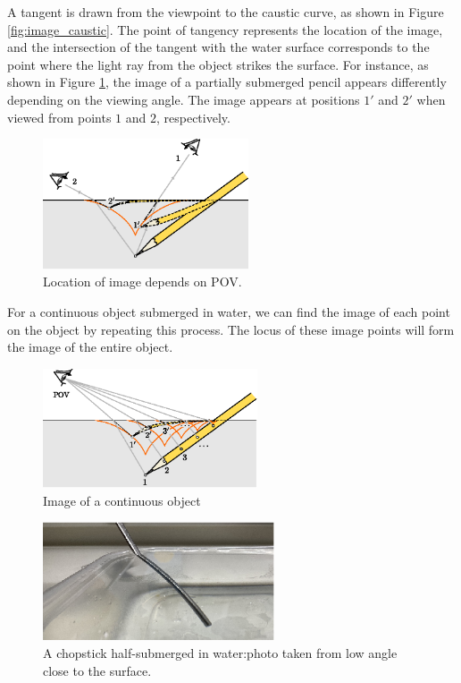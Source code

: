 \documentclass[twocolumn]{article}
\begin{document}
A tangent is drawn from the viewpoint to the caustic curve, as shown in Figure \ref{fig:image_caustic}. The point of tangency represents the location of the image, and the intersection of the tangent with the water surface corresponds to the point where the light ray from the object strikes the surface.
For instance, as shown in Figure \ref{fig:pencil_view}, the image of a partially submerged pencil appears differently depending on the viewing angle. The image appears at positions $1'$ and $2'$ when viewed from points $1$ and $2$, respectively.
\begin{figure}[ht]
	\centering
	\includegraphics[width=2.4in]{figs/g43.eps}
	\caption{Location of image depends on POV.}
	\label{fig:pencil_view}
\end{figure}

For a continuous object submerged in water, we can find the image of each point on the object by repeating this process. The locus of these image points will form the image of the entire object.

\begin{figure}[h]
	\centering
	\includegraphics*[width=2.5in]{figs/g242.eps}
	\caption{Image of a continuous object}
	\label{fig:extended_image}
\end{figure}

\begin{figure}[h]
	\centering
	\includegraphics[width=2.7in]{figs/img_1805_3.eps}
	\caption{A chopstick half-submerged in water:photo taken from low angle close to the surface.}
	\label{fig:picture}
\end{figure}
\end{document}
